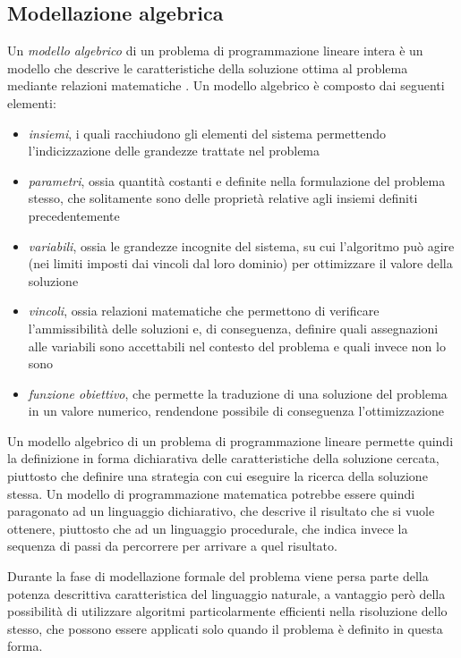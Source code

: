 \subsection{Modellazione algebrica}
Un \textit{modello algebrico} di un problema di programmazione lineare intera è un modello che descrive le caratteristiche della soluzione 
ottima al problema mediante relazioni matematiche \cite{rop}. Un modello algebrico è composto dai seguenti elementi:
\begin{itemize}
\item \textsl{insiemi}, i quali racchiudono gli elementi del sistema permettendo l'indicizzazione delle grandezze trattate nel problema
\item \textsl{parametri}, ossia quantità costanti e definite nella formulazione del problema stesso, che solitamente sono delle proprietà relative agli insiemi definiti precedentemente
\item \textsl{variabili}, ossia le grandezze incognite del sistema, su cui l'algoritmo può agire (nei limiti imposti dai vincoli dal loro dominio) per ottimizzare il valore della soluzione
\item \textsl{vincoli}, ossia relazioni matematiche che permettono di verificare l'ammissibilità delle soluzioni e, di conseguenza, definire quali assegnazioni alle variabili sono accettabili nel contesto del problema e quali invece non lo sono
\item \textsl{funzione obiettivo}, che permette la traduzione di una soluzione del problema in un valore numerico, rendendone possibile di conseguenza l'ottimizzazione
\end{itemize}

Un modello algebrico di un problema di programmazione lineare permette quindi la definizione in forma dichiarativa delle caratteristiche della soluzione cercata, 
piuttosto che definire una strategia con cui eseguire la ricerca della soluzione stessa. Un modello di programmazione matematica potrebbe essere quindi paragonato 
ad un linguaggio dichiarativo, che descrive il risultato che si vuole ottenere, piuttosto che ad un linguaggio procedurale, che indica invece la sequenza di passi 
da percorrere per arrivare a quel risultato.

Durante la fase di modellazione formale del problema viene persa parte della potenza descrittiva caratteristica del linguaggio naturale, a vantaggio però della 
possibilità di utilizzare algoritmi particolarmente efficienti nella risoluzione dello stesso, che possono essere applicati solo quando il problema è definito in questa forma.

